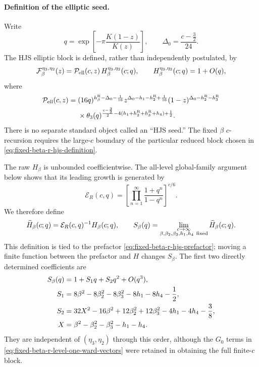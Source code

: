 \documentclass[11pt]{article}
\newcommand{\R}{\mathrm{R}}
\begin{document}
\paragraph{Definition of the elliptic seed.}
Write
\begin{equation}
 q=\exp\left[-\pi\frac{K(1-z)}{K(z)}\right],
 \qquad
 \Delta_0=\frac{c-\frac32}{24}.
\end{equation}
The HJS elliptic block is defined, rather than independently postulated, by
\begin{equation}
 \mathcal F_\beta^{\eta_3,\eta_2}(z)
 =
 \mathcal P_{\rm ell}(c,z)\,
 H_\beta^{\eta_3,\eta_2}(c;q),
 \qquad
 H_\beta^{\eta_3,\eta_2}(c;q)=1+O(q),
 \label{eq:fixed-beta-r-hjs-definition}
\end{equation}
where
\begin{align}
 \mathcal P_{\rm ell}(c,z)
 ={}&
 (16q)^{h_\beta^{\R}-\Delta_0-\frac1{16}}
 z^{\Delta_0-h_1-h_2^{\R}+\frac1{16}}
 (1-z)^{\Delta_0-h_2^{\R}-h_3^{\R}}
 \notag\\
 &\times
 \theta_3(q)^{
 \frac{c-\frac32}{2}
 -4(h_1+h_2^{\R}+h_3^{\R}+h_4)+\frac12}.
 \label{eq:fixed-beta-r-hjs-prefactor}
\end{align}
There is no separate standard object called an ``HJS seed.''  The fixed
\(\beta\) \(c\)-recursion requires the large-\(c\) boundary of the
particular reduced block chosen in
\eqref{eq:fixed-beta-r-hjs-definition}.

The raw \(H_\beta\) is unbounded coefficientwise.  The all-level
global-family argument below shows that its leading growth is generated by
\begin{equation}
 \mathcal E_R(c,q)
 =
 \left[
 \prod_{n=1}^{\infty}\frac{1+q^n}{1-q^n}
 \right]^{c/6}.
 \label{eq:fixed-beta-r-universal-growth}
\end{equation}
We therefore define
\begin{equation}
 \widehat H_\beta(c;q)
 =
 \mathcal E_R(c,q)^{-1}H_\beta(c;q),
 \qquad
 S_\beta(q)
 =
 \lim_{\substack{c\to\infty\\
 \beta,\beta_2,\beta_3,h_1,h_4\ {\rm fixed}}}
 \widehat H_\beta(c;q).
 \label{eq:fixed-beta-r-seed-definition}
\end{equation}
This definition is tied to the prefactor
\eqref{eq:fixed-beta-r-hjs-prefactor}; moving a finite function between
the prefactor and \(H\) changes \(S_\beta\).  The first two directly
determined coefficients are
\begin{align}
 S_\beta(q)
 &=
 1+S_1q+S_2q^2+O(q^3),
 \notag\\
 S_1
 &=
 8\beta^2-8\beta_2^2-8\beta_3^2
 -8h_1-8h_4-\frac12,
 \notag\\
 S_2
 &=
 32X^2-16\beta^2+12\beta_2^2+12\beta_3^2
 -4h_1-4h_4-\frac38,
 \notag\\
 X&=\beta^2-\beta_2^2-\beta_3^2-h_1-h_4.
 \label{eq:fixed-beta-r-seed-first-two}
\end{align}
They are independent of \((\eta_3,\eta_2)\) through this order, although
the \(G_0\) terms in
\eqref{eq:fixed-beta-r-level-one-ward-vectors} were retained in obtaining
the full finite-\(c\) block.
\end{document}
